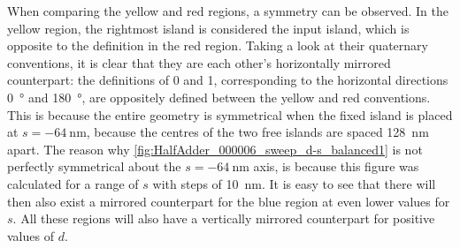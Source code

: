 \documentclass[11pt,a4paper,english]{article}
\begin{document}
When comparing the yellow and red regions, a symmetry can be observed. In the yellow region, the rightmost island is considered the input island, which is opposite to the definition in the red region. Taking a look at their quaternary conventions, it is clear that they are each other's horizontally mirrored counterpart: the definitions of 0 and 1, corresponding to the horizontal directions \SI{0}{\degree} and \SI{180}{\degree}, are oppositely defined between the yellow and red conventions. This is because the entire geometry is symmetrical when the fixed island is placed at $s=\SI{-64}{\nano\metre}$, because the centres of the two free islands are spaced \SI{128}{\nano\metre} apart. The reason why \cref{fig:HalfAdder_000006_sweep_d-s_balanced1} is not perfectly symmetrical about the $s=\SI{-64}{\nano\metre}$ axis, is because this figure was calculated for a range of $s$ with steps of \SI{10}{\nano\metre}. It is easy to see that there will then also exist a mirrored counterpart for the blue region at even lower values for $s$. All these regions will also have a vertically mirrored counterpart for positive values of $d$. \par
\end{document}
